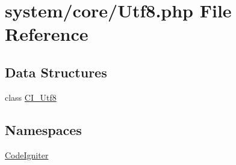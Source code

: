 \hypertarget{_utf8_8php}{\section{system/core/\-Utf8.php File Reference}
\label{_utf8_8php}
}
\subsection*{Data Structures}
\begin{DoxyCompactItemize}
\item 
class \hyperlink{class_c_i___utf8}{C\-I\-\_\-\-Utf8}
\end{DoxyCompactItemize}
\subsection*{Namespaces}
\begin{DoxyCompactItemize}
\item 
\hyperlink{namespace_code_igniter}{Code\-Igniter}
\end{DoxyCompactItemize}
